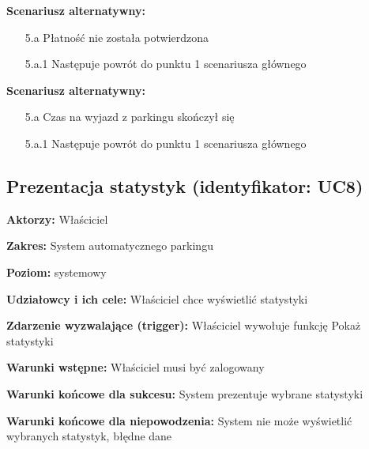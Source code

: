 \hspace{0cm}\textbf{Scenariusz alternatywny: }
\begin{enumerate}
\item[5.a] Płatność nie została potwierdzona
\item[5.a.1] Następuje powrót do punktu 1 scenariusza głównego
\end{enumerate}

\hspace{0cm}\textbf{Scenariusz alternatywny: }
\begin{enumerate}
\item[5.a] Czas na wyjazd z parkingu skończył się
\item[5.a.1] Następuje powrót do punktu 1 scenariusza głównego
\end{enumerate}

\subsection{Prezentacja statystyk (identyfikator: UC8)}
\textbf{Aktorzy: }Właściciel

\hspace{0cm}\textbf{Zakres: }System automatycznego parkingu

\hspace{0cm}\textbf{Poziom: }systemowy

\hspace{0cm}\textbf{Udziałowcy i ich cele: } Właściciel chce wyświetlić statystyki

\hspace{0cm}\textbf{Zdarzenie wyzwalające (trigger): } Właściciel wywołuje funkcję Pokaż statystyki

\hspace{0cm}\textbf{Warunki wstępne: }
Właściciel musi być zalogowany

\hspace{0cm}\textbf{Warunki końcowe dla sukcesu: } System prezentuje wybrane statystyki

\hspace{0cm}\textbf{Warunki końcowe dla niepowodzenia: } System nie może wyświetlić wybranych statystyk, błędne dane \newline

